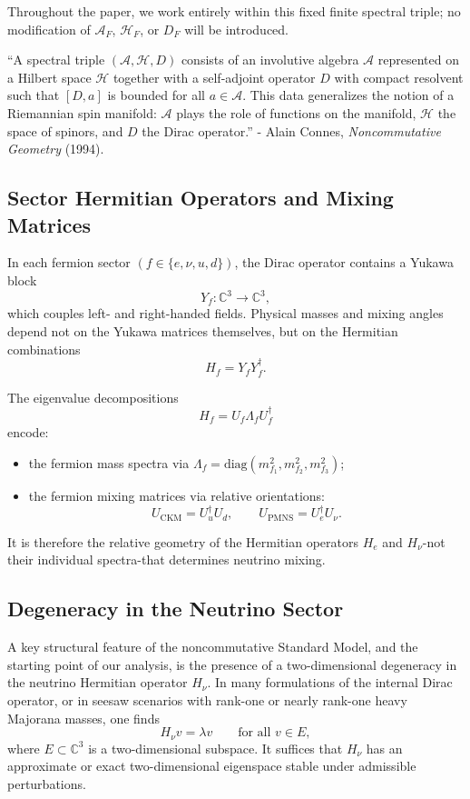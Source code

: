 Throughout the paper, we work entirely within this fixed finite spectral triple; no modification of $\mathcal A_F$, $\mathcal H_F$, or $D_F$ will be introduced.

``A spectral triple $(\mathcal A,\mathcal H,D)$ consists of an involutive algebra $\mathcal A$ represented on a Hilbert space $\mathcal H$ together with a self-adjoint operator $D$ with compact resolvent such that $[D,a]$ is bounded for all $a\in\mathcal A$. This data generalizes the notion of a Riemannian spin manifold: $\mathcal A$ plays the role of functions on the manifold, $\mathcal H$ the space of spinors, and $D$ the Dirac operator.'' - Alain Connes, \emph{Noncommutative Geometry} (1994).

\subsection{Sector Hermitian Operators and Mixing Matrices}

In each fermion sector $(f\in\{e,\nu,u,d\})$, the Dirac operator contains a Yukawa block
\[
Y_f : \mathbb C^3 \longrightarrow \mathbb C^3,
\]
which couples left- and right-handed fields. Physical masses and mixing angles depend not on the Yukawa matrices themselves, but on the Hermitian combinations
\[
H_f = Y_f Y_f^\dagger.
\]

The eigenvalue decompositions
\[
H_f = U_f \Lambda_f U_f^\dagger
\]
encode:
\begin{itemize}
\item the fermion mass spectra via $\Lambda_f = \mathrm{diag}(m_{f_1}^2,m_{f_2}^2,m_{f_3}^2)$;
\item the fermion mixing matrices via relative orientations:
\[
U_{\mathrm{CKM}} = U_u^\dagger U_d,\qquad
U_{\mathrm{PMNS}} = U_e^\dagger U_\nu.
\]
\end{itemize}

It is therefore the relative geometry of the Hermitian operators $H_e$ and $H_\nu$-not their individual spectra-that determines neutrino mixing.

\subsection{Degeneracy in the Neutrino Sector}

A key structural feature of the noncommutative Standard Model, and the starting point of our analysis, is the presence of a two-dimensional degeneracy in the neutrino Hermitian operator $H_\nu$. In many formulations of the internal Dirac operator, or in seesaw scenarios with rank-one or nearly rank-one heavy Majorana masses, one finds
\[
H_\nu v = \lambda v \qquad \text{for all } v\in E,
\]
where $E\subset\mathbb C^3$ is a two-dimensional subspace. It suffices that $H_\nu$ has an approximate or exact two-dimensional eigenspace stable under admissible perturbations.

